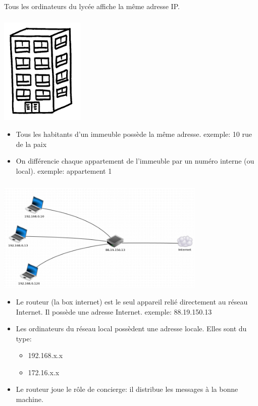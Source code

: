 \documentclass[svgnames,11pt]{beamer}
\begin{document}
\begin{frame}
    \frametitle{}

    \begin{aretenir}[Observation]
    Tous les ordinateurs du lycée affiche la même adresse IP.
    \end{aretenir}

\end{frame}
\begin{frame}
    \frametitle{}
\begin{center}
    \includegraphics[width=4cm]{ressources/immeuble.png}
\end{center}
    \begin{itemize}
    \item Tous les habitants d'un immeuble possède la même adresse. exemple: 10 rue de la paix
    \item On différencie chaque appartement de l'immeuble par un numéro interne (ou local). exemple: appartement 1
\end{itemize}
\end{frame}
\begin{frame}
    \frametitle{}
    \includegraphics[width=10cm]{ressources/local.png}

\begin{itemize}
    \item Le routeur (la box internet) est le seul appareil relié directement au réseau Internet. Il possède une adresse Internet. exemple: 88.19.150.13
    \item Les ordinateurs du réseau local possèdent une adresse locale. Elles sont du type:
    \begin{itemize}
        \item 192.168.x.x
        \item 172.16.x.x
    \end{itemize}
    \item Le routeur joue le rôle de concierge: il distribue les messages à la bonne machine.
\end{itemize}
\end{frame}
\end{document}
